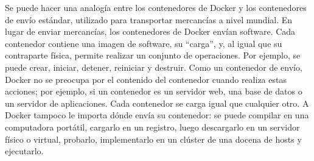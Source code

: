 Se puede hacer una analogía entre los contenedores de Docker y los contenedores 
de envío estándar, utilizado para transportar mercancías a nivel mundial. 
En lugar de enviar mercancías, los contenedores de Docker envían software. 
Cada contenedor contiene una imagen de software, su “carga”, y, al igual 
que su contraparte física, permite realizar un conjunto de operaciones. 
Por ejemplo, se puede crear, iniciar, detener, reiniciar y destruir. Como 
un contenedor de envío, Docker no se preocupa por el contenido del contenedor 
cuando realiza estas acciones; por ejemplo, si un contenedor es un servidor web, 
una base de datos o un servidor de aplicaciones. Cada contenedor se carga 
igual que cualquier otro. A Docker tampoco le importa dónde envía su contenedor: 
se puede compilar en una computadora portátil, cargarlo en un registro, luego 
descargarlo en un servidor físico o virtual, probarlo, implementarlo en un 
clúster de una docena de hosts y ejecutarlo. 


